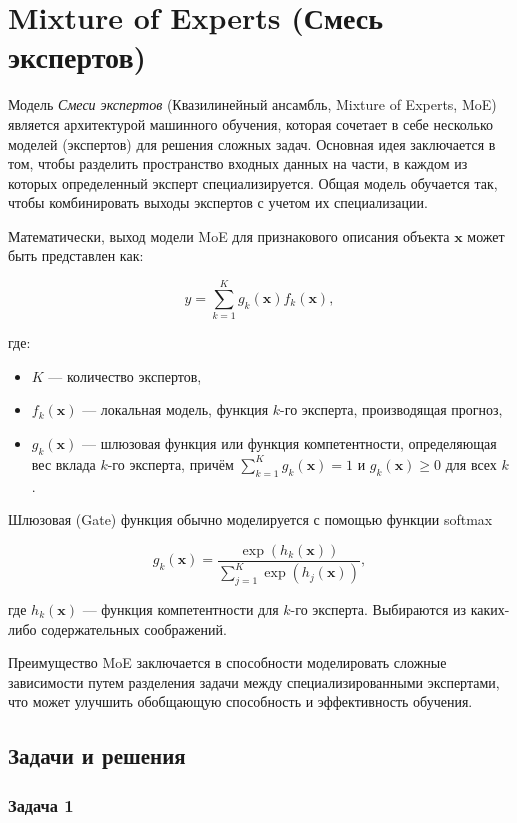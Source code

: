 \section{Mixture of Experts (Смесь экспертов)}

Модель \textit{Смеси экспертов} (Квазилинейный ансамбль, Mixture of Experts, MoE) является архитектурой машинного обучения, которая сочетает в себе несколько моделей (экспертов) для решения сложных задач. Основная идея заключается в том, чтобы разделить пространство входных данных на части, в каждом из которых определенный эксперт специализируется. Общая модель обучается так, чтобы комбинировать выходы экспертов с учетом их специализации.

Математически, выход модели MoE для признакового описания объекта $\mathbf{x}$ может быть представлен как:

$$
y = \sum_{k=1}^{K} g_k(\mathbf{x}) f_k(\mathbf{x}),
$$

где:
\begin{itemize}
    \item $K$ — количество экспертов,
    \item $f_k(\mathbf{x})$ — локальная модель, функция $k$-го эксперта, производящая прогноз,
    \item $g_k(\mathbf{x})$ — шлюзовая функция или функция компетентности, определяющая вес вклада $k$-го эксперта, причём $\sum_{k=1}^{K} g_k(\mathbf{x}) = 1$ и $g_k(\mathbf{x}) \geq 0$ для всех $k$.
\end{itemize}

Шлюзовая (Gate) функция обычно моделируется с помощью функции softmax

$$
g_k(\mathbf{x}) = \frac{\exp(h_k(\mathbf{x}))}{\sum_{j=1}^{K} \exp(h_j(\mathbf{x}))},
$$

где $h_k(\mathbf{x})$ — функция компетентности для $k$-го эксперта. Выбираются из каких-либо содержательных соображений.

Преимущество MoE заключается в способности моделировать сложные зависимости путем разделения задачи между специализированными экспертами, что может улучшить обобщающую способность и эффективность обучения.

\subsection{Задачи и решения}

\subsubsection{Задача 1}

